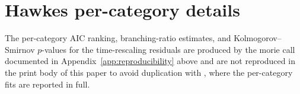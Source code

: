 \documentclass[article,shortnames,nojss]{jss}
\begin{document}
\section{Hawkes per-category details}
\label{app:hawkes-details}

The per-category AIC ranking, branching-ratio estimates, and
Kolmogorov--Smirnov $p$-values for the time-rescaling residuals are
produced by the morie call documented in
Appendix~\ref{app:reproducibility} above and are not reproduced in
the print body of this paper to avoid duplication with
\citet{Ruhela2026Hawkes}, where the per-category fits are reported
in full.


\end{document}

